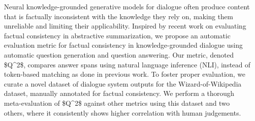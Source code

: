 Neural knowledge-grounded generative models for dialogue often produce content that is factually inconsistent with the knowledge they rely on, making them unreliable and limiting their applicability. Inspired by recent work on evaluating factual consistency in abstractive summarization, we propose an automatic evaluation metric for factual consistency in knowledge-grounded dialogue using automatic question generation and question answering. Our metric, denoted \$Q^2\$, compares answer spans using natural language inference (NLI), instead of token-based matching as done in previous work. To foster proper evaluation, we curate a novel dataset of dialogue system outputs for the Wizard-of-Wikipedia dataset, manually annotated for factual consistency. We perform a thorough meta-evaluation of \$Q^2\$ against other metrics using this dataset and two others, where it consistently shows higher correlation with human judgements.
